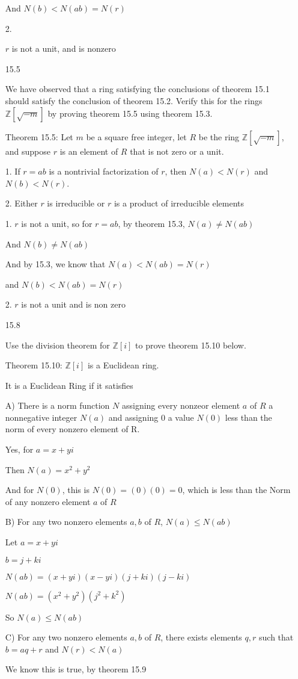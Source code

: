 \documentclass[12pt]{article}
\begin{document}
\begin{itemize}
	And $N(b) < N(ab) = N(r)$

	2. 

	$r$ is not a unit, and is nonzero



\newpage 
\item[15.5]

	We have observed that a ring satisfying the conclusions of theorem 15.1 should satisfy the conclusion of theorem 15.2. Verify this for the rings $\mathbb{Z}[\sqrt{-m}]$ by proving theorem 15.5 using theorem 15.3.

	Theorem 15.5:	Let $m$ be a square free integer, let $R$ be the ring $\mathbb{Z}[\sqrt{-m}]$, and suppose $r$ is an element of $R$ that is not zero or a unit.

	1. If $r = ab$ is a nontrivial factorization of $r$, then $N(a) < N(r)$ and $N(b) < N(r)$.

	2. Either $r$ is irreducible or $r$ is a product of irreducible elements

	1. $r$ is not a unit, so for $r = ab$, by theorem 15.3, $N(a) \neq N(ab)$

	And $N(b) \neq N(ab)$

	And by 15.3, we know that $N(a) < N(ab) = N(r)$

	and $N(b) < N(ab) = N(r)$

	2. $r$ is not a unit and is non zero


\newpage 
\item[15.8]

	Use the division theorem for $\mathbb{Z}[i]$ to prove theorem 15.10 below.

	Theorem 15.10: $\mathbb{Z}[i]$ is a Euclidean ring.

	It is a Euclidean Ring if it satisfies 

	A) There is a norm function $N$ assigning every nonzeor element $a$ of $R$ a nonnegative integer $N(a)$ and assigning 0 a value $N(0)$ less than the norm of every nonzero element of R.

	Yes, for $a = x + yi$

	Then $N(a) = x^2 + y^2$

	And for $N(0)$, this is $N(0) = (0)(0) = 0$, which is less than the Norm of any nonzero element $a$ of $R$

	B) For any two nonzero elements $a,b$ of $R$, $N(a) \leq N(ab)$

	Let $a = x + yi$

	$b = j + ki$

	$N(ab) = (x+yi)(x-yi)(j+ki)(j-ki)$

	$N(ab) = (x^2+y^2)(j^2 + k^2)$

	So $N(a) \leq N(ab)$

	C) For any two nonzero elements $a, b$ of $R$, there exists elements $q,r$ such that $b = aq + r$ and $N(r) < N(a)$

	We know this is true, by theorem 15.9

\end{itemize}
\end{document}
